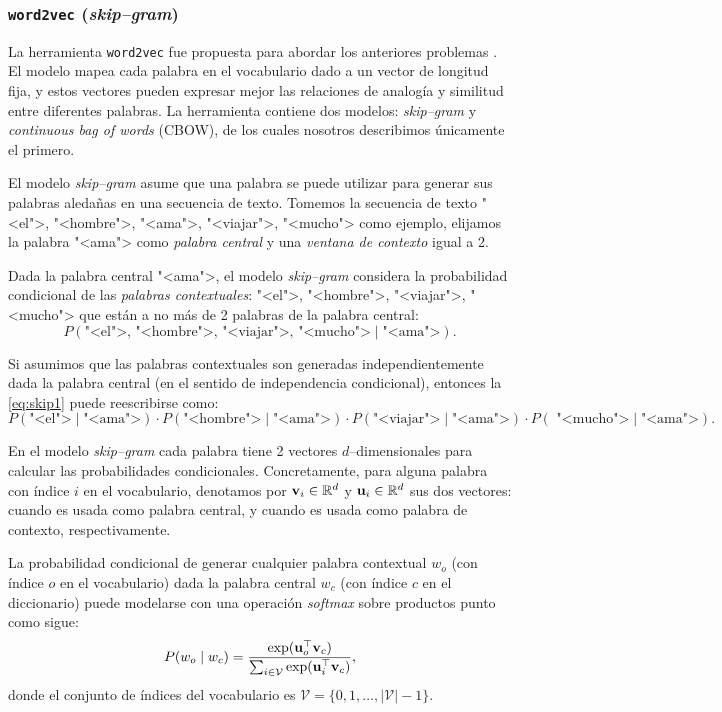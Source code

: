 \documentclass[12pt]{article}
\newcommand{\R}{\mathbb{R}}
\newcommand{\code}{\texttt}
\newcommand{\ce}{\bm{\textbf v}}
\newcommand{\co}{\bm{\textbf u}}
\begin{document}
\subsubsection{\code{word2vec} (\textit{skip--gram})}

La herramienta \code{word2vec} fue propuesta para abordar los anteriores problemas \parencite{Mikolov2013}. El modelo mapea cada palabra en el vocabulario dado a un vector de longitud fija, y estos vectores pueden expresar mejor las relaciones de analogía y similitud entre diferentes palabras. La herramienta contiene dos modelos: \textit{skip--gram} y \textit{continuous bag of words} (CBOW), de los cuales nosotros describimos únicamente el primero.

El modelo \textit{skip--gram} asume que una palabra se puede utilizar para generar sus palabras aledañas en una secuencia de texto. Tomemos la secuencia de texto "<el">, "<hombre">, "<ama">, "<viajar">, "<mucho"> como ejemplo, elijamos la palabra "<ama"> como \textit{palabra central} y una \textit{ventana de contexto} igual a 2. 

Dada la palabra central "<ama">, el modelo \textit{skip--gram} considera la probabilidad condicional de las \textit{palabras contextuales}: "<el">, "<hombre">, "<viajar">, "<mucho"> que están a no más de 2 palabras de la palabra central:
\begin{equation}
    P(\text{"<el">, "<hombre">, "<viajar">, "<mucho">}\mid\text{"<ama">}). \label{eq:skip1}
\end{equation}

Si asumimos que las palabras contextuales son generadas independientemente dada la palabra central (en el sentido de independencia condicional), entonces la \cref{eq:skip1} puede reescribirse como:
\begin{equation}
    P(\text{"<el">}\mid\text{"<ama">}) \cdot P(\text{"<hombre">}\mid\text{"<ama">}) \cdot P(\text{"<viajar">}\mid\text{"<ama">}) \cdot P(\text{ "<mucho">}\mid\text{"<ama">}).
\end{equation}

En el modelo \textit{skip--gram} cada palabra tiene 2 vectores $ d $--dimensionales para calcular las probabilidades condicionales. Concretamente, para alguna palabra con índice $ i $ en el vocabulario, denotamos por $ \ce_i \in \R^{d} $ y $ \co_i \in \R^{d} $ sus dos vectores: cuando es usada como palabra central, y cuando es usada como palabra de contexto, respectivamente. 

La probabilidad condicional de generar cualquier palabra contextual $ w_o $ (con índice $ o $ en el vocabulario) dada la palabra central $ w_c $ (con índice $ c $ en el diccionario) puede modelarse con una operación \textit{softmax} sobre productos punto como sigue:
\begin{equation}
    P(w_o \mid w_c) = \frac{\exp(\co_o^{\top}\ce_c)}{\sum_{i \in \mathcal{V}}\exp(\co_i^{\top}\ce_c)},
\end{equation}
donde el conjunto de índices del vocabulario es $ \mathcal{V} = \{0, 1, \ldots, |\mathcal{V}| - 1\} $.
\end{document}

